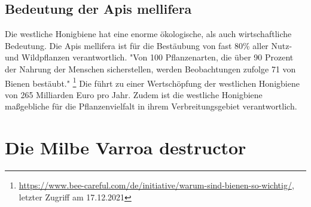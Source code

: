\documentclass[11pt,a4paper]{article}
\begin{document}
\subsection{Bedeutung der Apis mellifera}
Die westliche Honigbiene hat eine enorme ökologische, als auch wirtschaftliche Bedeutung. Die Apis mellifera ist für die Bestäubung von fast 80\% aller Nutz- und Wildpflanzen verantwortlich. "Von 100 Pflanzenarten, die über 90 Prozent der Nahrung der Menschen sicherstellen, werden Beobachtungen zufolge 71 von Bienen bestäubt." \footnote{\url{https://www.bee-careful.com/de/initiative/warum-sind-bienen-so-wichtig/}, letzter Zugriff am 17.12.2021} Die führt zu einer Wertschöpfung der westlichen Honigbiene von 265 Milliarden Euro pro Jahr. Zudem ist die westliche Honigbiene maßgebliche für die Pflanzenvielfalt in ihrem Verbreitungsgebiet verantwortlich.  

\section{Die Milbe Varroa destructor}
\end{document}
